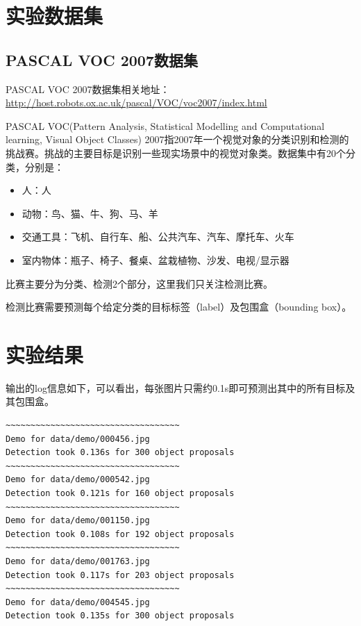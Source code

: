 \documentclass[a4paper, 12pt, UTF8]{article}
\begin{document}
\section{实验数据集}

\subsection{PASCAL VOC 2007数据集}

PASCAL VOC 2007数据集相关地址：\url{http://host.robots.ox.ac.uk/pascal/VOC/voc2007/index.html}

PASCAL VOC(Pattern Analysis, Statistical Modelling and Computational learning, Visual Object Classes) 2007指2007年一个视觉对象的分类识别和检测的挑战赛。挑战的主要目标是识别一些现实场景中的视觉对象类。数据集中有20个分类，分别是：

\begin{itemize}

\item 人：人

\item 动物：鸟、猫、牛、狗、马、羊

\item 交通工具：飞机、自行车、船、公共汽车、汽车、摩托车、火车

\item 室内物体：瓶子、椅子、餐桌、盆栽植物、沙发、电视/显示器

\end{itemize}

比赛主要分为分类、检测2个部分，这里我们只关注检测比赛。

检测比赛需要预测每个给定分类的目标标签（label）及包围盒（bounding box）。


\section{实验结果}

输出的log信息如下，可以看出，每张图片只需约0.1s即可预测出其中的所有目标及其包围盒。

\begin{lstlisting}
~~~~~~~~~~~~~~~~~~~~~~~~~~~~~~~~~~~
Demo for data/demo/000456.jpg
Detection took 0.136s for 300 object proposals
~~~~~~~~~~~~~~~~~~~~~~~~~~~~~~~~~~~
Demo for data/demo/000542.jpg
Detection took 0.121s for 160 object proposals
~~~~~~~~~~~~~~~~~~~~~~~~~~~~~~~~~~~
Demo for data/demo/001150.jpg
Detection took 0.108s for 192 object proposals
~~~~~~~~~~~~~~~~~~~~~~~~~~~~~~~~~~~
Demo for data/demo/001763.jpg
Detection took 0.117s for 203 object proposals
~~~~~~~~~~~~~~~~~~~~~~~~~~~~~~~~~~~
Demo for data/demo/004545.jpg
Detection took 0.135s for 300 object proposals
\end{lstlisting}
\end{document}
